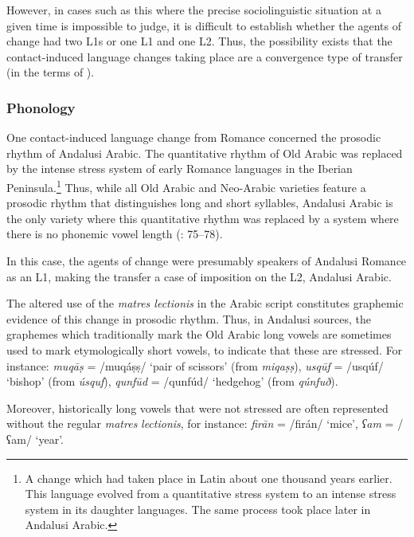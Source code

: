 \documentclass[output=paper,modfonts,nonflat]{langsci/langscibook}
\begin{document}
However, in cases such as this where the precise sociolinguistic situation at a given time is impossible to judge, it is difficult to establish whether the agents of change had two L1s or one L1 and one L2. Thus, the possibility exists that the contact-induced language changes taking place are a convergence type of transfer (in the terms of \citealt{Lucas2015}). 




\subsubsection{\label{bkm:Ref12959774}Phonology}




One contact-induced language change from Romance concerned the prosodic rhythm of Andalusi Arabic. The quantitative rhythm of Old Arabic was replaced by the intense stress system of early Romance languages in the Iberian Peninsula.\footnote{A change which had taken place in Latin about one thousand years earlier. This language evolved from a quantitative stress system to an intense stress system in its daughter languages. The same process took place later in Andalusi Arabic.} Thus, while all Old Arabic and Neo-Arabic varieties feature a prosodic rhythm that distinguishes long and short syllables, Andalusi Arabic is the only variety where this quantitative rhythm was replaced by a system where there is no phonemic vowel length (\citealt{Corriente1977,Corriente1992chapter,CorrientePereiraVicente2015}: 75–78).

In this case, the agents of change were presumably speakers of Andalusi Romance as an L1, making the transfer a case of imposition on the L2, Andalusi Arabic. 

The altered use of the \textit{matres lectionis} in the Arabic script constitutes graphemic evidence of this change in prosodic rhythm. Thus, in Andalusi sources, the graphemes which traditionally mark the Old Arabic long vowels are sometimes used to mark etymologically short vowels, to indicate that these are stressed. For instance: {} \textit{{muqāṣ}} = /muqáṣṣ/ ‘pair of scissors’ (from \textit{miqaṣṣ}), {} \textit{usqūf} = /usqúf/ ‘bishop’ (from \textit{úsquf}), {} \textit{qunfūd} = /qunfúd/ ‘hedgehog’ (from \textit{qúnfuð}).  

Moreover, historically long vowels that were not stressed are often represented without the regular \textit{matres} \textit{lectionis}, for instance: {} \textit{firān} = /firán/ ‘mice’, {} \textit{ʕam} = /ʕam/ ‘year’.
\end{document}
